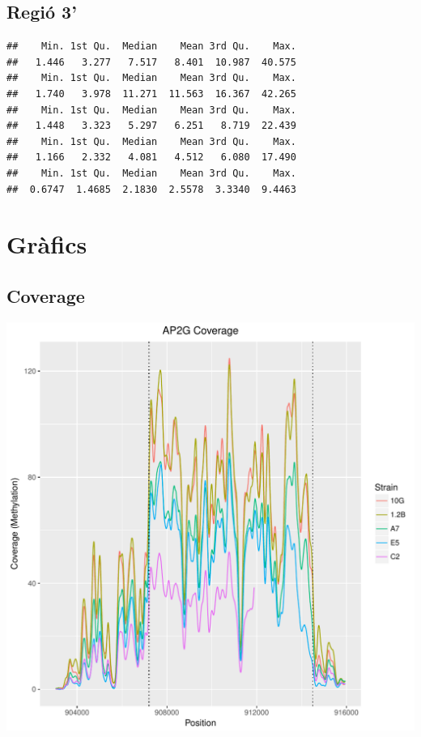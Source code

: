 \documentclass{article}\usepackage[]{graphicx}\usepackage[]{color}
\makeatletter
\newenvironment{kframe}{%
 \def\at@end@of@kframe{}%
 \ifinner\ifhmode%
  \def\at@end@of@kframe{\end{minipage}}%
  \begin{minipage}{\columnwidth}%
 \fi\fi%
 \def\FrameCommand##1{\hskip\@totalleftmargin \hskip-\fboxsep
 \colorbox{shadecolor}{##1}\hskip-\fboxsep
     \hskip-\linewidth \hskip-\@totalleftmargin \hskip\columnwidth}%
 \MakeFramed {\advance\hsize-\width
   \@totalleftmargin\z@ \linewidth\hsize
   \@setminipage}}%
 {\par\unskip\endMakeFramed%
 \at@end@of@kframe}
\newenvironment{knitrout}{}{} %
\makeatother
\begin{document}
\subsection{Regió 3'}
\begin{knitrout}
\color{fgcolor}\begin{kframe}
\begin{verbatim}
##    Min. 1st Qu.  Median    Mean 3rd Qu.    Max. 
##   1.446   3.277   7.517   8.401  10.987  40.575 
##    Min. 1st Qu.  Median    Mean 3rd Qu.    Max. 
##   1.740   3.978  11.271  11.563  16.367  42.265 
##    Min. 1st Qu.  Median    Mean 3rd Qu.    Max. 
##   1.448   3.323   5.297   6.251   8.719  22.439 
##    Min. 1st Qu.  Median    Mean 3rd Qu.    Max. 
##   1.166   2.332   4.081   4.512   6.080  17.490 
##    Min. 1st Qu.  Median    Mean 3rd Qu.    Max. 
##  0.6747  1.4685  2.1830  2.5578  3.3340  9.4463
\end{verbatim}
\end{kframe}
\end{knitrout}
\clearpage


\section{Gràfics}
\subsection{Coverage}
\begin{knitrout}
\color{fgcolor}
\includegraphics[width=1\linewidth]{figure/plot_coverage-1} 

\end{knitrout}
\clearpage
\end{document}
